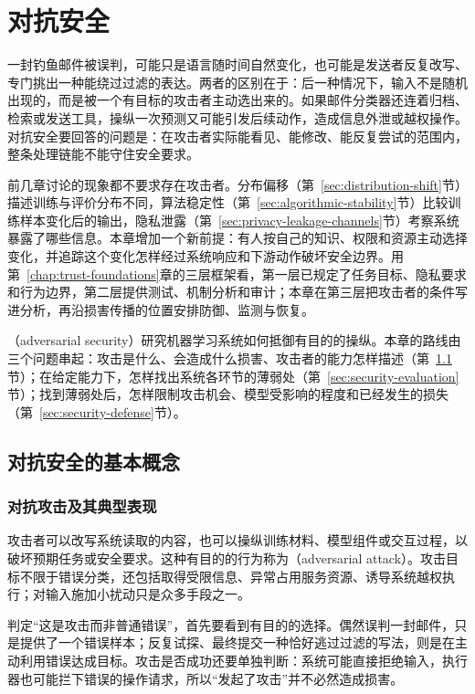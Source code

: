 \chapter{对抗安全}
\label{chap:trust-security}

一封钓鱼邮件被误判，可能只是语言随时间自然变化，也可能是发送者反复改写、专门挑出一种能绕过过滤的表达。两者的区别在于：后一种情况下，输入不是随机出现的，而是被一个有目标的攻击者主动选出来的。如果邮件分类器还连着归档、检索或发送工具，操纵一次预测又可能引发后续动作，造成信息外泄或越权操作。对抗安全要回答的问题是：在攻击者实际能看见、能修改、能反复尝试的范围内，整条处理链能不能守住安全要求。

前几章讨论的现象都不要求存在攻击者。分布偏移（第~\ref{sec:distribution-shift}节）描述训练与评价分布不同，算法稳定性（第~\ref{sec:algorithmic-stability}节）比较训练样本变化后的输出，隐私泄露（第~\ref{sec:privacy-leakage-channels}节）考察系统暴露了哪些信息。本章增加一个新前提：有人按自己的知识、权限和资源主动选择变化，并追踪这个变化怎样经过系统响应和下游动作破坏安全边界。用第~\ref{chap:trust-foundations}章的三层框架看，第一层已规定了任务目标、隐私要求和行为边界，第二层提供测试、机制分析和审计；本章在第三层把攻击者的条件写进分析，再沿损害传播的位置安排防御、监测与恢复。

（adversarial security）研究机器学习系统如何抵御有目的的操纵。本章的路线由三个问题串起：攻击是什么、会造成什么损害、攻击者的能力怎样描述（第~\ref{sec:security-threats}节）；在给定能力下，怎样找出系统各环节的薄弱处（第~\ref{sec:security-evaluation}节）；找到薄弱处后，怎样限制攻击机会、模型受影响的程度和已经发生的损失（第~\ref{sec:security-defense}节）。

\section{对抗安全的基本概念}
\label{sec:security-threats}

\subsection{对抗攻击及其典型表现}
\label{sec:security-attack-definition}

攻击者可以改写系统读取的内容，也可以操纵训练材料、模型组件或交互过程，以破坏预期任务或安全要求。这种有目的的行为称为（adversarial attack）。攻击目标不限于错误分类，还包括取得受限信息、异常占用服务资源、诱导系统越权执行；对输入施加小扰动只是众多手段之一。

判定“这是攻击而非普通错误”，首先要看到有目的的选择。偶然误判一封邮件，只是提供了一个错误样本；反复试探、最终提交一种恰好逃过过滤的写法，则是在主动利用错误达成目标。攻击是否成功还要单独判断：系统可能直接拒绝输入，执行器也可能拦下错误的操作请求，所以“发起了攻击”并不必然造成损害。

